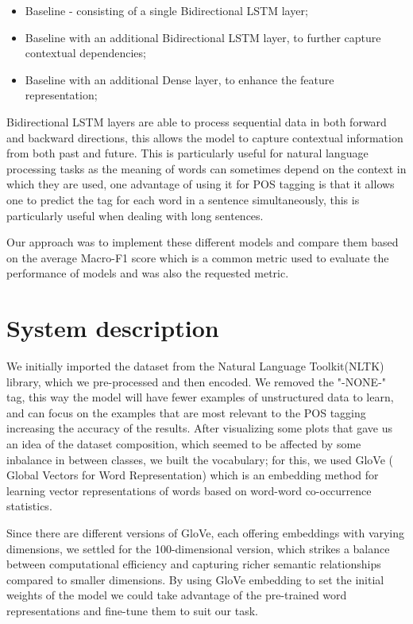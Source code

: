 \documentclass[11pt]{article}
\begin{document}
\begin{itemize}
    \item Baseline - consisting of a single Bidirectional LSTM layer;
    \item Baseline with an additional Bidirectional LSTM layer,  to further capture contextual dependencies;
    \item Baseline with an additional Dense layer, to enhance the feature representation;
\end{itemize}

Bidirectional LSTM layers are able to process sequential data in both forward and backward directions, this allows the model to capture contextual information from both past and future. This is particularly useful for natural language processing tasks as the meaning of words can sometimes depend on the context in which they are used, one advantage of using it for POS tagging is that it allows one to predict the tag for each word in a sentence simultaneously, this is particularly useful when dealing with long sentences.

Our approach was to implement these different models and compare them based on the average Macro-F1 score which is a common metric used to evaluate the performance of models and was also the requested metric. 

\section{System description}
\label{sec:system}
We initially imported the dataset from the Natural Language Toolkit(NLTK) library, which we pre-processed and then encoded.
We removed the "-NONE-" tag, this way the model will have fewer examples of unstructured data to learn, and can focus on the examples that are most relevant to the POS tagging increasing the accuracy of the results.
After visualizing  some plots that gave us an idea of the dataset composition, which seemed to be affected by some inbalance in between classes, we built the vocabulary; for this, we used GloVe ( Global Vectors for Word Representation) which is an embedding method for learning vector representations of words based on word-word co-occurrence statistics.

Since there are different versions of GloVe, each offering embeddings with varying dimensions, we settled for the 100-dimensional version, which strikes a balance between computational efficiency and capturing richer semantic relationships compared to smaller dimensions. By using GloVe embedding to set the initial weights of the model we could take advantage of the pre-trained word representations and fine-tune them to suit our task.
\end{document}
